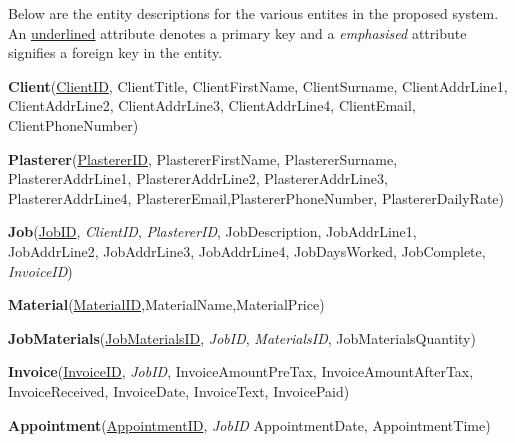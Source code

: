 \begin{flushleft}

Below are the entity descriptions for the various entites in the proposed system. An \underline{underlined} attribute denotes a primary key and a \emph{emphasised}	attribute signifies a foreign key in the entity.

\end{flushleft}




\begin{flushleft}
	\textbf{Client}(\underline{ClientID}, ClientTitle, ClientFirstName, ClientSurname, ClientAddrLine1, ClientAddrLine2, ClientAddrLine3, ClientAddrLine4, ClientEmail, ClientPhoneNumber)
\end{flushleft}



\begin{flushleft}
	\textbf{Plasterer}(\underline{PlastererID}, PlastererFirstName, PlastererSurname, PlastererAddrLine1, PlastererAddrLine2, PlastererAddrLine3, PlastererAddrLine4, PlastererEmail,PlastererPhoneNumber, PlastererDailyRate)
\end{flushleft}



\begin{flushleft}
\textbf{Job}(\underline{JobID}, \emph{ClientID}, \emph{PlastererID}, JobDescription, JobAddrLine1, JobAddrLine2, JobAddrLine3, JobAddrLine4, JobDaysWorked,  JobComplete, \emph{InvoiceID})
\end{flushleft}


\begin{flushleft}
\textbf{Material}(\underline{MaterialID},MaterialName,MaterialPrice)
\end{flushleft}


\begin{flushleft}
\textbf{JobMaterials}(\underline{JobMaterialsID}, \emph{JobID}, \emph{MaterialsID}, JobMaterialsQuantity)
\end{flushleft}


\begin{flushleft}
\textbf{Invoice}(\underline{InvoiceID}, \emph{JobID}, InvoiceAmountPreTax, InvoiceAmountAfterTax, InvoiceReceived, InvoiceDate, InvoiceText, InvoicePaid)
\end{flushleft}



\begin{flushleft}
\textbf{Appointment}(\underline{AppointmentID}, \emph{JobID} AppointmentDate, AppointmentTime)
\end{flushleft}

